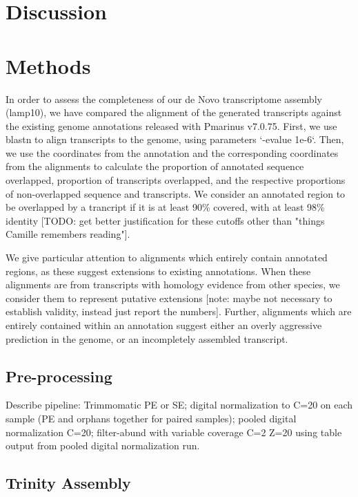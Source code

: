 \documentclass{article}
\begin{document}


\section*{Discussion}

\section*{Methods}


In order to assess the completeness of our de Novo transcriptome assembly (lamp10), we have compared
the alignment of the generated transcripts against the existing genome annotations released with
Pmarinus v7.0.75. First, we use blastn to align transcripts to the genome, using parameters 
`-evalue 1e-6`. Then, we use the coordinates from the annotation and the corresponding coordinates 
from the alignments to calculate the proportion of annotated sequence overlapped, proportion of
transcripts overlapped, and the respective proportions of non-overlapped sequence and transcripts.
We consider an annotated region to be overlapped by a trancript if it is at least 90\% covered, with
at least 98\% identity [TODO: get better justification for these cutoffs other than "things Camille 
remembers reading"].

We give particular attention to alignments which entirely contain annotated regions, as these
suggest extensions to existing annotations. When these alignments are from transcripts with homology
evidence from other species, we consider them to represent putative extensions [note: maybe not
necessary to establish validity, instead just report the numbers]. Further, alignments which are 
entirely contained within an annotation suggest either an overly aggressive prediction in the genome, 
or an incompletely assembled transcript.

\subsection*{Pre-processing}

Describe pipeline: Trimmomatic PE or SE; digital normalization to C=20 on each sample (PE and
orphans together for paired samples); pooled digital normalization C=20; filter-abund with variable
coverage C=2 Z=20 using table output from pooled digital normalization run.

\subsection*{Trinity Assembly}
\end{document}
